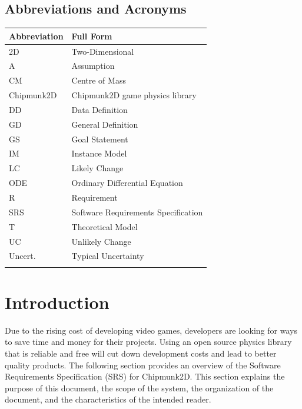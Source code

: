 \documentclass[12pt]{article}
\begin{document}
\subsection{Abbreviations and Acronyms}
\label{Sec:TAbbAcc}
\begin{longtable*}{l l}
\toprule
Abbreviation & Full Form
\\
\midrule
2D & Two-Dimensional
\\
A & Assumption
\\
CM & Centre of Mass
\\
Chipmunk2D & Chipmunk2D game physics library
\\
DD & Data Definition
\\
GD & General Definition
\\
GS & Goal Statement
\\
IM & Instance Model
\\
LC & Likely Change
\\
ODE & Ordinary Differential Equation
\\
R & Requirement
\\
SRS & Software Requirements Specification
\\
T & Theoretical Model
\\
UC & Unlikely Change
\\
Uncert. & Typical Uncertainty
\\
\bottomrule
\label{Table:TAbbAcc}
\end{longtable*}
\section{Introduction}
\label{Sec:Intro}
Due to the rising cost of developing video games, developers are looking for ways to save time and money for their projects. Using an open source physics library that is reliable and free will cut down development costs and lead to better quality products.
The following section provides an overview of the Software Requirements Specification (SRS) for Chipmunk2D. This section explains the purpose of this document, the scope of the system, the organization of the document, and the characteristics of the intended reader.
\end{document}
